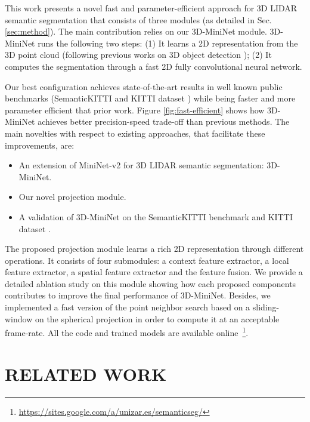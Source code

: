 \documentclass[letterpaper, 10 pt, journal, twoside]{IEEEtran}
\begin{document}
This work presents a novel fast and parameter-efficient approach for 3D LIDAR semantic segmentation that consists of three modules (as detailed in Sec. \ref{sec:method}). The main contribution relies on our 
3D-MiniNet module. 
3D-MiniNet runs the following two steps: (1) It learns a 2D representation from the 3D point cloud (following previous works on 3D object detection \cite{lang2019pointpillars, zhou2018voxelnet, zhou2020end}); (2) It computes the segmentation through a fast 2D fully convolutional neural network.

Our best configuration achieves state-of-the-art results in well known public benchmarks (SemanticKITTI \cite{behley2019semantickitti} and KITTI dataset \cite{geiger2012wekitti}) while being faster and more parameter efficient that prior work. Figure \ref{fig:fast-efficient} shows how 3D-MiniNet achieves better precision-speed trade-off than previous methods. 
The main novelties with respect to existing approaches, that facilitate these improvements, are:
\begin{itemize}
\item An extension of MiniNet-v2 for 3D LIDAR semantic segmentation: 3D-MiniNet.
\item Our novel projection module.
 
\item A validation of 3D-MiniNet on the SemanticKITTI benchmark \cite{behley2019semantickitti} and KITTI dataset \cite{geiger2012wekitti}. 

\end{itemize}




The proposed projection module learns a rich 2D representation through different operations. It consists of four submodules: a context feature extractor, a local feature extractor, a spatial feature extractor and the feature fusion. We provide a detailed ablation study on this module showing how each proposed components contributes to improve the final performance of 3D-MiniNet.
Besides, we implemented a fast version of the point neighbor search based on a sliding-window on the spherical projection \cite{lunet} in order to compute it at an acceptable frame-rate. All the code and trained models are available online~\footnote{\url{https://sites.google.com/a/unizar.es/semanticseg/}}.


 
\section{RELATED WORK}
\end{document}
